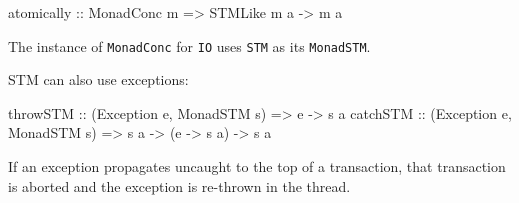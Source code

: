 \begin{haskellcode}
atomically :: MonadConc m => STMLike m a -> m a
\end{haskellcode}

The instance of \verb|MonadConc| for \verb|IO| uses \verb|STM| as its
\verb|MonadSTM|.

STM can also use exceptions:

\begin{haskellcode}
throwSTM :: (Exception e, MonadSTM s) => e -> s a
catchSTM :: (Exception e, MonadSTM s) => s a -> (e -> s a) -> s a
\end{haskellcode}

If an exception propagates uncaught to the top of a transaction, that
transaction is aborted and the exception is re-thrown in the thread.
